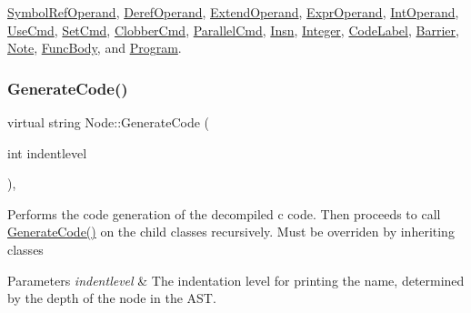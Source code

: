 \hyperlink{class_symbol_ref_operand_a41ac48ee73184e0fe254ea735c7ea471}{Symbol\+Ref\+Operand}, \hyperlink{class_deref_operand_a970e6fbc520f6e9f2aee97a306fa1eae}{Deref\+Operand}, \hyperlink{class_extend_operand_ad8496c498f62dd060ea265eff6ec72da}{Extend\+Operand}, \hyperlink{class_expr_operand_a322d7d7cd1aae5b592349824f147b570}{Expr\+Operand}, \hyperlink{class_int_operand_ac509fc25d25b9a69b63ddbdf54f5a353}{Int\+Operand}, \hyperlink{class_use_cmd_a3da3017201b8b7573481cf58c4702050}{Use\+Cmd}, \hyperlink{class_set_cmd_ad3d2a13f9dd92cddd09c3c280e601583}{Set\+Cmd}, \hyperlink{class_clobber_cmd_a3f519dc016d05f38518e6ded60afaee1}{Clobber\+Cmd}, \hyperlink{class_parallel_cmd_afacbf01fd5416bfdc3c20837fefc4dde}{Parallel\+Cmd}, \hyperlink{class_insn_a1e175152ea14cde985c5176e5a226f3d}{Insn}, \hyperlink{class_integer_ac3ffa2f3f2d9feaed58bbb2a5d8f1c59}{Integer}, \hyperlink{class_code_label_a7318d2169f33b5296d9f98e17213f634}{Code\+Label}, \hyperlink{class_barrier_af36430f51da20c09b6e3fa1d6e875fef}{Barrier}, \hyperlink{class_note_a33934adfae6685ff299c6ee9a57fd1f5}{Note}, \hyperlink{class_func_body_a6114d98f4cd6e0341cb8662750266477}{Func\+Body}, and \hyperlink{class_program_a7a533446b23a020e661463df819ae49d}{Program}.

\mbox{\label{class_node_acb60e526730e8436056375a3055c2c32}} 
\subsubsection{\texorpdfstring{Generate\+Code()}{GenerateCode()}}
{\footnotesize\ttfamily virtual string Node\+::\+Generate\+Code (\begin{DoxyParamCaption}\item[{int}]{indentlevel }\end{DoxyParamCaption})\hspace{0.3cm}{\ttfamily [inline]}, {\ttfamily [virtual]}}

Performs the code generation of the decompiled c code. Then proceeds to call \hyperlink{class_node_acb60e526730e8436056375a3055c2c32}{Generate\+Code()} on the child classes recursively. Must be overriden by inheriting classes 
\begin{DoxyParams}{Parameters}
{\em indentlevel} & The indentation level for printing the name, determined by the depth of the node in the A\+ST. \\
\hline
\end{DoxyParams}



